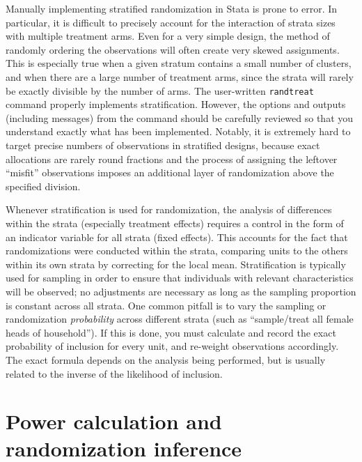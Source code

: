 Manually implementing stratified randomization in Stata is prone to error.
In particular, it is difficult to precisely account
for the interaction of strata sizes with multiple treatment arms.
Even for a very simple design, the method of randomly ordering the observations
will often create very skewed assignments.
This is especially true when a given stratum contains a small number of clusters,
and when there are a large number of treatment arms,
since the strata will rarely be exactly divisible by the number of arms.\cite{carril2017dealing}
The user-written \texttt{randtreat} command properly implements stratification.
However, the options and outputs (including messages) from the command should be carefully reviewed
so that you understand exactly what has been implemented.
Notably, it is extremely hard to target precise numbers of observations
in stratified designs, because exact allocations are rarely round fractions
and the process of assigning the leftover ``misfit'' observations
imposes an additional layer of randomization above the specified division.


Whenever stratification is used for randomization,
the analysis of differences within the strata (especially treatment effects)
requires a control in the form of an indicator variable for all strata (fixed effects).
This accounts for the fact that randomizations were conducted within the strata,
comparing units to the others within its own strata by correcting for the local mean.
Stratification is typically used for sampling
in order to ensure that individuals with relevant characteristics will be observed;
no adjustments are necessary as long as the sampling proportion is constant across all strata.
One common pitfall is to vary the sampling or randomization \textit{probability}
across different strata (such as ``sample/treat all female heads of household'').
If this is done, you must calculate and record the exact probability
of inclusion for every unit, and re-weight observations accordingly.
The exact formula depends on the analysis being performed,
but is usually related to the inverse of the likelihood of inclusion.


\section{Power calculation and randomization inference}

